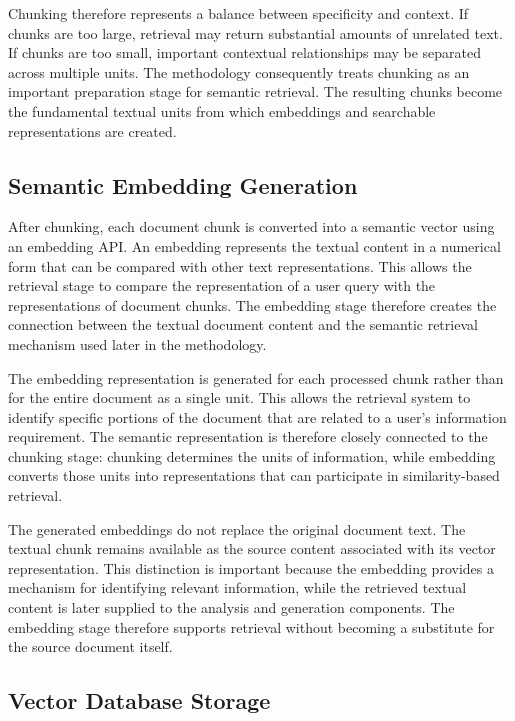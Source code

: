 \documentclass[12pt,a4paper,oneside]{report}
\begin{document}
Chunking therefore represents a balance between specificity and context. If
chunks are too large, retrieval may return substantial amounts of unrelated
text. If chunks are too small, important contextual relationships may be
separated across multiple units. The methodology consequently treats
chunking as an important preparation stage for semantic retrieval. The
resulting chunks become the fundamental textual units from which embeddings
and searchable representations are created.

\subsection{Semantic Embedding Generation}

After chunking, each document chunk is converted into a semantic vector
using an embedding API. An embedding represents the textual content in a
numerical form that can be compared with other text representations. This
allows the retrieval stage to compare the representation of a user query
with the representations of document chunks. The embedding stage therefore
creates the connection between the textual document content and the
semantic retrieval mechanism used later in the methodology.

The embedding representation is generated for each processed chunk rather
than for the entire document as a single unit. This allows the retrieval
system to identify specific portions of the document that are related to a
user's information requirement. The semantic representation is therefore
closely connected to the chunking stage: chunking determines the units of
information, while embedding converts those units into representations that
can participate in similarity-based retrieval.

The generated embeddings do not replace the original document text. The
textual chunk remains available as the source content associated with its
vector representation. This distinction is important because the embedding
provides a mechanism for identifying relevant information, while the
retrieved textual content is later supplied to the analysis and generation
components. The embedding stage therefore supports retrieval without
becoming a substitute for the source document itself.

\subsection{Vector Database Storage}
\end{document}
